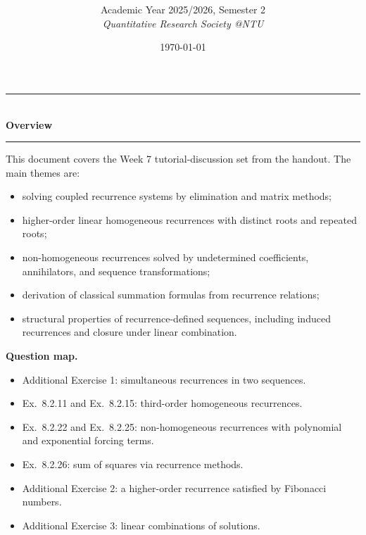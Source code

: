 \documentclass[12pt]{article}
\title{
\CourseCode \CourseName \\[0.3em]
\large \DocType
}
\author{
  Academic Year 2025/2026, Semester 2 \\[0.25em]
  \textit{Quantitative Research Society @NTU}
}
\date{\today}
\begin{document}
\maketitle
\thispagestyle{plainfirst}
\pagestyle{main}

\begin{center}
  \rule{0.82\textwidth}{0.4pt}\\[4pt]
  \textbf{Overview}\\[2pt]
  \rule{0.82\textwidth}{0.4pt}
\end{center}

\noindent
This document covers the Week 7 tutorial-discussion set from the handout. The main themes are:
\begin{itemize}[leftmargin=*]
  \item solving coupled recurrence systems by elimination and matrix methods;
  \item higher-order linear homogeneous recurrences with distinct roots and repeated roots;
  \item non-homogeneous recurrences solved by undetermined coefficients, annihilators, and sequence transformations;
  \item derivation of classical summation formulas from recurrence relations;
  \item structural properties of recurrence-defined sequences, including induced recurrences and closure under linear combination.
\end{itemize}

\noindent
\textbf{Question map.}
\begin{itemize}[leftmargin=*]
  \item Additional Exercise 1: simultaneous recurrences in two sequences.
  \item Ex.\ 8.2.11 and Ex.\ 8.2.15: third-order homogeneous recurrences.
  \item Ex.\ 8.2.22 and Ex.\ 8.2.25: non-homogeneous recurrences with polynomial and exponential forcing terms.
  \item Ex.\ 8.2.26: sum of squares via recurrence methods.
  \item Additional Exercise 2: a higher-order recurrence satisfied by Fibonacci numbers.
  \item Additional Exercise 3: linear combinations of solutions.
\end{itemize}

\newpage
\tableofcontents
\newpage
\end{document}
